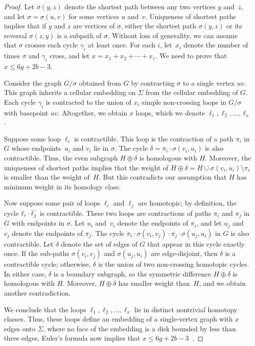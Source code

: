 \documentclass{sig-alternate}
\begin{document}
\begin{proof}
Let $\sigma(y,z)$ denote the shortest path between any two vertices $y$ and~$z$, and let $\sigma = \sigma(u,v)$ for some vertices $u$ and~$v$.  Uniqueness of shortest paths implies that if $y$ and $z$ are vertices of $\sigma$, either the shortest path $\sigma(y,z)$ or its reversal $\sigma(z,y)$ is a subpath of $\sigma$.  Without loss of generality, we can assume that $\sigma$ crosses each cycle $\gamma_i$ at least once.  For each $i$, let~$x_i$ denote the number of times $\sigma$ and $\gamma_i$ cross, and let $x = x_1 + x_2 + \cdots + x_r$.  We need to prove that $x\le 6g+2b-3$.

Consider the graph $G/\sigma$ obtained from $G$ by contracting $\sigma$ to a single vertex $uv$.  This graph inherits a cellular embedding on $\Sigma$ from the cellular embedding of $G$.  Each cycle $\gamma_i$ is contracted to the union of $x_i$ simple non-crossing loops in $G/\sigma$ with basepoint $uv$.  Altogether, we obtain $x$ loops, which we denote $\ell_1, \ell_2, \dots, \ell_x$.

Suppose some loop $\ell_i$ is contractible.  This loop is the contraction of a path $\pi_i$ in $G$ whose endpoints~$u_i$ and $v_i$ lie in $\sigma$.  The cycle $\delta = \pi_i \cdot \sigma(v_i,u_i)$ is also contractible.  Thus, the even subgraph $H\oplus\delta$ is homologous with $H$.  Moreover, the uniqueness of shortest paths implies that the weight of $H\oplus\delta = H \cup \sigma(v_i,u_i) \setminus \pi_i$ is smaller than the weight of~$H$.  But this contradicts our assumption that $H $ has minimum weight in its homology class.

Now suppose some pair of loops $\ell_i$ and $\ell_j$ are homotopic; by definition, the cycle $\ell_i\cdot\smash{\overline{\ell_j}}$ is contractible.  These two loops are contractions of paths $\pi_i$ and $\pi_j$ in $G$ with endpoints in $\sigma$.  Let $u_i$ and~$v_i$ denote the endpoints of $\pi_i$, and let $u_j$ and~$v_j$ denote the endpoints of $\pi_j$.  The cycle $\pi_i \cdot \sigma(v_i,v_j) \cdot \overline{\pi_j} \cdot \sigma(u_j, u_i)$ in $G$ is also contractible.  Let $\delta$ denote the set of edges of $G$ that appear in this cycle exactly once.  If the sub-paths $\sigma(v_i,v_j)$ and $\sigma(u_j, u_i)$ are edge-disjoint, then $\delta$ is a contractible cycle; otherwise, $\delta$ is the union of two non-crossing homotopic cycles.  In either case, $\delta$ is a boundary subgraph, so the symmetric difference $H\oplus\delta$ is homologous with $H$.  Moreover, $H\oplus\delta$ has smaller weight than~$H$, and we obtain another contradiction.

We conclude that the loops $\ell_1, \ell_2, \dots, \ell_x$ lie in distinct nontrivial homotopy classes.  Thus, these loops define an embedding of a single-vertex graph with $x$ edges onto $\Sigma$, where no face of the embedding is a disk bounded by less than three edges.  Euler's formula now implies that $x\le 6g+2b-3$~\cite[Lemma~2.1]{ccelw-scsih-08}.
\end{proof}
\end{document}
